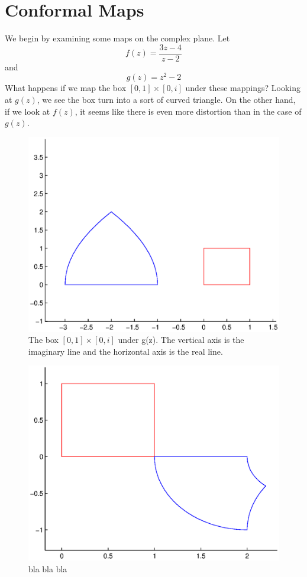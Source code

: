 \section*{Conformal Maps}

We begin by examining some maps on the complex plane.  Let
\[
f(z) = \frac{3z - 4}{z - 2}
\]
and
\[
g(z) = z^2 - 2
\]
What happens if we map the box $[0,1]\times[0,i]$ under these mappings?  
\newpage
Looking at $g(z)$, we see the box turn into a sort of curved triangle.  On the other hand, if we look at $f(z)$, it seems like there is even more distortion than in the case of $g(z)$.
\begin{figure}
\begin{center}
\includegraphics[scale=0.5]{map1}
\caption{The box $[0,1]\times[0,i]$ under g(z).  The vertical axis is the imaginary line and the horizontal axis is the real line.}
\end{center}
\end{figure}

\begin{figure}
\begin{center}
\includegraphics[scale=0.5]{map2}
\caption{bla bla bla}
\end{center}
\end{figure}

